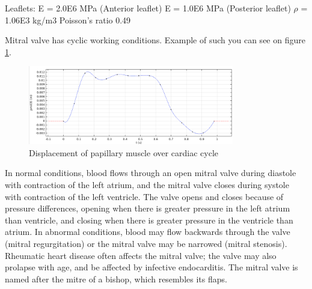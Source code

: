 Leaflets:
E = 2.0E6 MPa (Anterior leaflet)
E = 1.0E6 MPa (Posterior leaflet)
$\rho$ = 1.06E3 kg/m3 
Poisson’s ratio 0.49 
\par
Mitral valve has cyclic working conditions. Example of such you can see on
figure \ref{fig:workMT}.
\begin{figure}[H]
  \centering
  \includegraphics[width=0.8\textwidth]{./fig/workMT.png}
    \caption{Displacement of papillary muscle over cardiac cycle}
    \label{fig:workMT}
\end{figure}
 In normal conditions, blood flows through an open mitral valve during diastole
with contraction of the left atrium, and the mitral valve closes during systole
with contraction of the left ventricle. The valve opens and closes because of
pressure differences, opening when there is greater pressure in the left atrium
than ventricle, and closing when there is greater pressure in the ventricle than
atrium. In abnormal conditions, blood may flow backwards through the valve
(mitral regurgitation) or the mitral valve may be narrowed (mitral stenosis).
Rheumatic heart disease often affects the mitral valve; the valve may also
prolapse with age, and be affected by infective endocarditis. The mitral valve
is named after the mitre of a bishop, which resembles its flaps.

